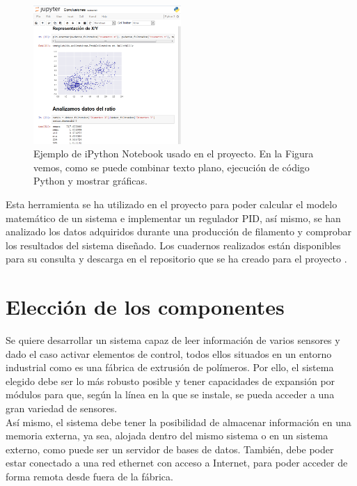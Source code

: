\begin{figure}[!ht]
    \centering
    \includegraphics[width=0.5\textwidth]{images/ipython.png}
    \caption[Ejemplo de iPython Notebook usado en el proyecto.]{Ejemplo de iPython Notebook usado en el proyecto. En la Figura vemos, como se puede combinar texto plano, ejecución de código Python y mostrar gráficas.}
    \label{fig:ipython}
\end{figure}

Esta herramienta se ha utilizado en el proyecto para poder calcular el modelo matemático de un sistema e implementar un regulador PID, así mismo, se han analizado los datos adquiridos durante una producción de filamento y comprobar los resultados del sistema diseñado. Los cuadernos realizados están disponibles para su consulta y descarga en el repositorio que se ha creado para el proyecto \cite{githubTFG}.


\section{Elección de los componentes}

Se quiere desarrollar un sistema capaz de leer información de varios sensores y dado el caso activar elementos de control, todos ellos situados en un entorno industrial como es una fábrica de extrusión de polímeros. Por ello, el sistema elegido debe ser lo más robusto posible y tener capacidades de expansión por módulos para que, según la línea en la que se instale, se pueda acceder a una gran variedad de sensores.\\ 

Así mismo, el sistema debe tener la posibilidad de almacenar información en una memoria externa, ya sea, alojada dentro del mismo sistema o en un sistema externo, como puede ser un servidor de bases de datos. También, debe poder estar conectado a una red ethernet con acceso a Internet, para poder acceder de forma remota desde fuera de la fábrica.\\ 

